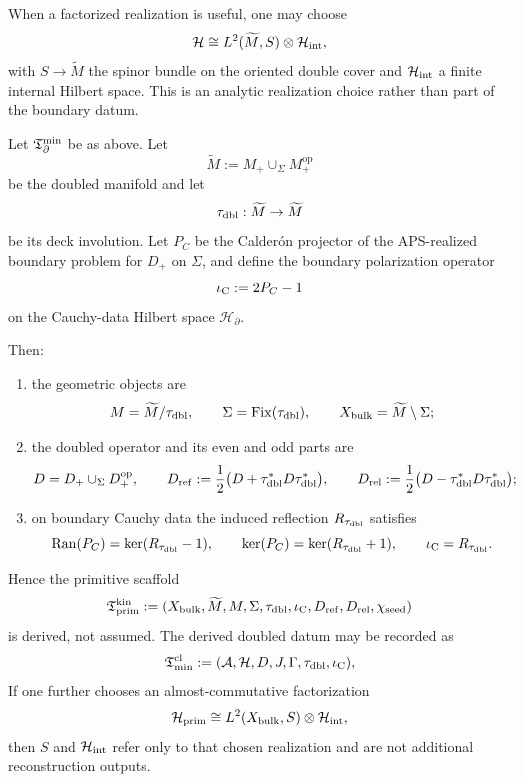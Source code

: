 \begin{remark}
\label{ass:almost-commutative-factorization}
When a factorized realization is useful, one may choose
\[
\mathcal H\cong L^2(\widetilde M,S)\otimes \mathcal H_{\mathrm{int}},
\]
with $S\to\widetilde M$ the spinor bundle on the oriented double cover and $\mathcal H_{\mathrm{int}}$ a finite
internal Hilbert space. This is an analytic realization choice rather than part of the boundary
datum.
\end{remark}

\begin{theorem}
\label{thm:primitive-datum-from-reduced-datum}
\label{thm:primitive-scaffold-from-reduced-datum}
Let $\mathfrak T_{\partial}^{\min}$ be as above. Let
\[
\widetilde M:=M_+\cup_{\Sigma} M_+^{\mathrm{op}}
\]
be the doubled manifold and let
\[
\tau_{\mathrm{dbl}}:\widetilde M\to\widetilde M
\]
be its deck involution. Let $P_C$ be the Calder\'on projector of the APS-realized boundary problem
for $D_+$ on $\Sigma$, and define the boundary polarization operator
\[
\iota_{\mathrm C}:=2P_C-1
\]
on the Cauchy-data Hilbert space $\mathcal H_{\partial}$.

Then:
\begin{enumerate}[label=(\roman*), leftmargin=1.8em, topsep=3pt, itemsep=2pt]
    \item the geometric objects are
    \[
    M=\widetilde M/\tau_{\mathrm{dbl}},
    \qquad
    \Sigma=\mathrm{Fix}(\tau_{\mathrm{dbl}}),
    \qquad
    X_{\mathrm{bulk}}=\widetilde M\setminus\Sigma;
    \]
    \item the doubled operator and its even and odd parts are
    \[
    D=D_+\cup_{\Sigma}D_+^{\mathrm{op}},
    \qquad
    D_{\mathrm{ref}}:=\frac12\bigl(D+\tau_{\mathrm{dbl}}^{\ast}D\tau_{\mathrm{dbl}}^{\ast}\bigr),
    \qquad
    D_{\mathrm{rel}}:=\frac12\bigl(D-\tau_{\mathrm{dbl}}^{\ast}D\tau_{\mathrm{dbl}}^{\ast}\bigr);
    \]
    \item on boundary Cauchy data the induced reflection $R_{\tau_{\mathrm{dbl}}}$ satisfies
    \[
    \operatorname{Ran}(P_C)=\ker(R_{\tau_{\mathrm{dbl}}}-1),
    \qquad
    \ker(P_C)=\ker(R_{\tau_{\mathrm{dbl}}}+1),
    \qquad
    \iota_{\mathrm C}=R_{\tau_{\mathrm{dbl}}}.
    \]
\end{enumerate}
Hence the primitive scaffold
\[
\mathfrak T_{\mathrm{prim}}^{\mathrm{kin}}
:=
(X_{\mathrm{bulk}},\widetilde M,M,\Sigma,\tau_{\mathrm{dbl}},\iota_{\mathrm C},D_{\mathrm{ref}},D_{\mathrm{rel}},\chi_{\mathrm{seed}})
\]
is derived, not assumed. The derived doubled datum may be recorded as
\[
\mathfrak T_{\mathrm{min}}^{\mathrm{cl}}:=(\mathcal A,\mathcal H,D,J,\Gamma,\tau_{\mathrm{dbl}},\iota_{\mathrm C}),
\]
If one further chooses an almost-commutative factorization
\[
\mathcal H_{\mathrm{prim}}\cong L^2(X_{\mathrm{bulk}},S)\otimes \mathcal H_{\mathrm{int}},
\]
then $S$ and $\mathcal H_{\mathrm{int}}$ refer only to that chosen realization and are not additional
reconstruction outputs.
\end{theorem}

